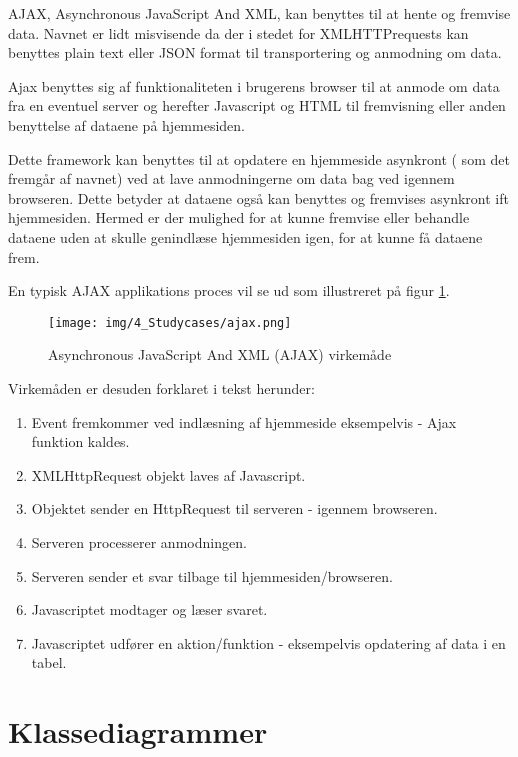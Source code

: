 \begin{appendices}
AJAX, Asynchronous JavaScript And XML, kan benyttes til at hente og fremvise data. Navnet er lidt misvisende da der i stedet for XMLHTTPrequests kan benyttes plain text eller JSON format til transportering og anmodning om data.

Ajax benyttes sig af funktionaliteten i brugerens browser til at anmode om data fra en eventuel server og herefter Javascript og HTML til fremvisning eller anden benyttelse af dataene på hjemmesiden.

Dette framework kan benyttes til at opdatere en hjemmeside asynkront ( som det fremgår af navnet) ved at lave anmodningerne om data bag ved igennem browseren. Dette betyder at dataene også kan benyttes og fremvises asynkront ift hjemmesiden. Hermed er der mulighed for at kunne fremvise eller behandle dataene uden at skulle genindlæse hjemmesiden igen, for at kunne få dataene frem.

En typisk AJAX applikations proces vil se ud som illustreret på figur \ref{fig:ajax_virkemaede}.

\begin{figure}[H]
	\centering{}
	\texttt{[image: img/4\_Studycases/ajax.png]}
	\caption{Asynchronous JavaScript And XML (AJAX) virkemåde}
	\label{fig:ajax_virkemaede}
\end{figure}

Virkemåden er desuden forklaret i tekst herunder:

\begin{enumerate}
	\item Event fremkommer ved indlæsning af hjemmeside eksempelvis - Ajax funktion kaldes.
	\item XMLHttpRequest objekt laves af Javascript.
	\item Objektet sender en HttpRequest til serveren - igennem browseren.
	\item Serveren processerer anmodningen.
	\item Serveren sender et svar tilbage til hjemmesiden/browseren.
	\item Javascriptet modtager og læser svaret.
	\item Javascriptet udfører en aktion/funktion - eksempelvis opdatering af data i en tabel.
\end{enumerate}

\pagebreak

\chapter{Klassediagrammer} \label{appendix::klassediagrammer}



\end{appendices}
